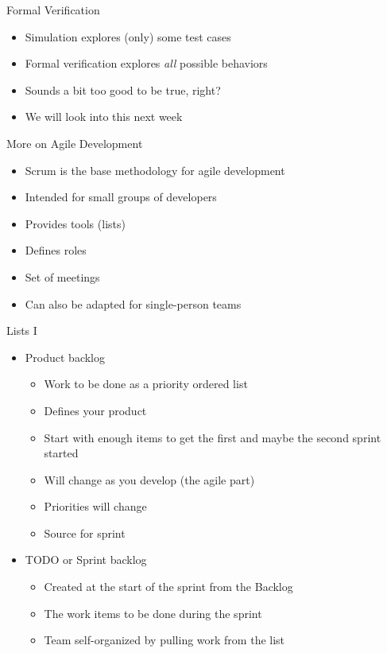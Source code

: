 \begin{frame}[fragile]{Formal Verification}
\begin{itemize}
\item Simulation explores (only) some test cases
\item Formal verification explores \emph{all} possible behaviors
\item Sounds a bit too good to be true, right?
\item We will look into this next week
\end{itemize}
\end{frame}


\begin{frame}[fragile]{More on Agile Development}
\begin{itemize}
\item Scrum is the base methodology for agile development
\item Intended for small groups of developers
\item Provides tools (lists)
\item Defines roles
\item Set of meetings
\item Can also be adapted for single-person teams
\end{itemize}
\end{frame}

\begin{frame}[fragile]{Lists I}
\begin{itemize}
\item Product backlog
\begin{itemize}
\item Work to be done as a priority ordered list
\item Defines your product
\item Start with enough items to get the first and maybe the second sprint started
\item Will change as you develop (the agile part)
\item Priorities will change
\item Source for sprint
\end{itemize}
\item TODO or Sprint backlog
\begin{itemize}
\item Created at the start of the sprint from the Backlog
\item The work  items to be done during the sprint
\item Team self-organized by pulling work from the list
\end{itemize}
\end{itemize}
\end{frame}

